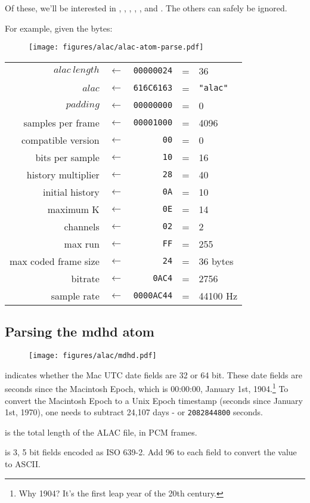 Of these, we'll be interested in ,
, , ,
,  and .
The others can safely be ignored.

\clearpage

For example, given the bytes:
\par
\begin{figure}[h]
\texttt{[image: figures/alac/alac-atom-parse.pdf]}
\end{figure}
\begin{tabular}{rcrcl}
$alac~length$ & $\leftarrow$ & \texttt{00000024} & = & 36 \\
$alac$ & $\leftarrow$ & \texttt{616C6163} & = & \texttt{"alac"} \\
$padding$ & $\leftarrow$ & \texttt{00000000} & = & 0 \\
samples per frame & $\leftarrow$ & \texttt{00001000} & = & 4096 \\
compatible version & $\leftarrow$ & \texttt{00} & = & 0 \\
bits per sample & $\leftarrow$ & \texttt{10} & = & 16 \\
history multiplier & $\leftarrow$ & \texttt{28} & = & 40 \\
initial history & $\leftarrow$ & \texttt{0A} & = & 10 \\
maximum K & $\leftarrow$ & \texttt{0E} & = & 14 \\
channels & $\leftarrow$ & \texttt{02} & = & 2 \\
max run & $\leftarrow$ & \texttt{FF} & = & 255 \\
max coded frame size & $\leftarrow$ & \texttt{24} & = & 36 bytes \\
bitrate & $\leftarrow$ & \texttt{0AC4} & = & 2756 \\
sample rate & $\leftarrow$ & \texttt{0000AC44} & = & 44100 Hz\\
\end{tabular}

\clearpage

\subsection{Parsing the mdhd atom}
\label{alac:read_mdhd_atom}
\begin{figure}[h]
\texttt{[image: figures/alac/mdhd.pdf]}
\end{figure}
\par
\noindent
{} indicates whether the Mac UTC date fields are 32 or 64 bit.
These date fields are seconds since the Macintosh Epoch,
which is 00:00:00, January 1st, 1904.\footnote{Why 1904?
 It's the first leap year of the 20th century.}
To convert the Macintosh Epoch to a Unix Epoch timestamp
(seconds since January 1st, 1970), one needs to subtract 24,107 days -
or \texttt{2082844800} seconds.
\par
\noindent
{} is the total length of the ALAC file, in PCM frames.
\par
\noindent
{} is 3, 5 bit fields encoded as ISO 639-2.
Add 96 to each field to convert the value to ASCII.

